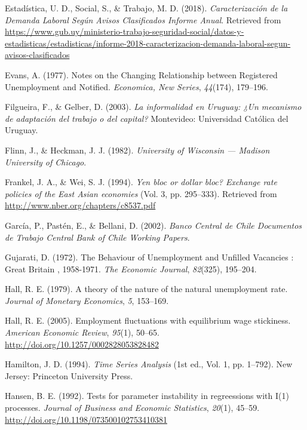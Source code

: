 \documentclass[12pt,oneside]{reedthesis}
\begin{document}
\leavevmode\hypertarget{ref-MTSS2018}{}%
Estadística, U. D., Social, S., \& Trabajo, M. D. (2018). \emph{Caracterización de la Demanda Laboral Según Avisos Clasificados Informe Anual}. Retrieved from \url{https://www.gub.uy/ministerio-trabajo-seguridad-social/datos-y-estadisticas/estadisticas/informe-2018-caracterizacion-demanda-laboral-segun-avisos-clasificados}

\leavevmode\hypertarget{ref-Evans1977}{}%
Evans, A. (1977). Notes on the Changing Relationship between Registered Unemployment and Notified. \emph{Economica, New Series}, \emph{44}(174), 179--196.

\leavevmode\hypertarget{ref-Filgueira2003}{}%
Filgueira, F., \& Gelber, D. (2003). \emph{La informalidad en Uruguay: ¿Un mecanismo de adaptación del trabajo o del capital?} Montevideo: Universidad Católica del Uruguay.

\leavevmode\hypertarget{ref-Flinn1982}{}%
Flinn, J., \& Heckman, J. J. (1982). \emph{University of Wisconsin --- Madison University of Chicago}.

\leavevmode\hypertarget{ref-Frankel1994}{}%
Frankel, J. A., \& Wei, S. J. (1994). \emph{Yen bloc or dollar bloc? Exchange rate policies of the East Asian economies} (Vol. 3, pp. 295--333). Retrieved from \url{http://www.nber.org/chapters/c8537.pdf}

\leavevmode\hypertarget{ref-BankChile2002}{}%
García, P., Pastén, E., \& Bellani, D. (2002). \emph{Banco Central de Chile Documentos de Trabajo Central Bank of Chile Working Papers}.

\leavevmode\hypertarget{ref-Gujarati1972}{}%
Gujarati, D. (1972). The Behaviour of Unemployment and Unfilled Vacancies : Great Britain , 1958-1971. \emph{The Economic Journal}, \emph{82}(325), 195--204.

\leavevmode\hypertarget{ref-Hall1979}{}%
Hall, R. E. (1979). A theory of the nature of the natural unemployment rate. \emph{Journal of Monetary Economics}, \emph{5}, 153--169.

\leavevmode\hypertarget{ref-Hall2005}{}%
Hall, R. E. (2005). Employment fluctuations with equilibrium wage stickiness. \emph{American Economic Review}, \emph{95}(1), 50--65. \url{http://doi.org/10.1257/0002828053828482}

\leavevmode\hypertarget{ref-Hamilton1994}{}%
Hamilton, J. D. (1994). \emph{Time Series Analysis} (1st ed., Vol. 1, pp. 1--792). New Jersey: Princeton University Press.

\leavevmode\hypertarget{ref-Hansen1992}{}%
Hansen, B. E. (1992). Tests for parameter instability in regreessions with I(1) processes. \emph{Journal of Business and Economic Statistics}, \emph{20}(1), 45--59. \url{http://doi.org/10.1198/073500102753410381}
\end{document}
